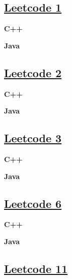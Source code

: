 \subsection{\href{https://leetcode-cn.com/}{Leetcode 1}}\label{app:codelist:leetcode:1}

\textbf{C++}\par


\textbf{Java}\par



\subsection{\href{https://leetcode-cn.com/}{Leetcode 2}}\label{app:codelist:leetcode:2}

\textbf{C++}\par


\textbf{Java}\par



\subsection{\href{https://leetcode-cn.com/}{Leetcode 3}}\label{app:codelist:leetcode:3}

\textbf{C++}\par


\textbf{Java}\par



\subsection{\href{https://leetcode-cn.com/}{Leetcode 6}}\label{app:codelist:leetcode:6}

\textbf{C++}\par


\textbf{Java}\par



\subsection{\href{https://leetcode-cn.com/}{Leetcode 11}}\label{app:codelist:leetcode:11}

